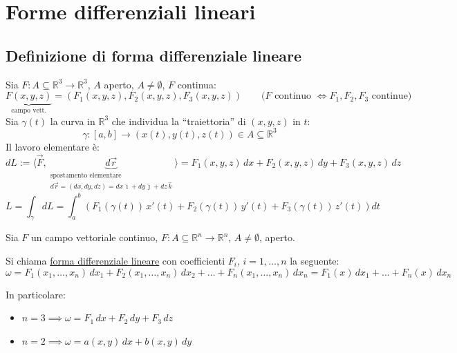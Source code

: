
\section{Forme differenziali lineari}

\subsection{Definizione di forma differenziale lineare}

Sia $F : A \subseteq \mathbb{R}^3 \to \mathbb{R}^3$, $A$ aperto, $A \neq \emptyset$, $F$ continua:
\[
\underbrace{F(x, y, z)}_{\text{campo vett.}} = (F_1(x, y, z), F_2(x, y, z), F_3(x, y, z)) \qquad \text{($F$ continuo $\iff F_1, F_2, F_3$ continue)}
\]
Sia $\gamma(t)$ la curva in $\mathbb{R}^3$ che individua la ``traiettoria'' di $(x, y, z)$ in $t$:
\[
\gamma : [a, b] \to (x(t), y(t), z(t)) \in A \subseteq \mathbb{R}^3
\]
Il lavoro elementare è:
\[
dL := \langle \vec{F}, \underbrace{d\vec{r}}_{\substack{\text{spostamento elementare} \\ d\vec{r} = (dx, dy, dz) = dx\,\hat{\imath} + dy\,\hat{\jmath} + dz\,\hat{k}}} \rangle = F_1(x, y, z)\, dx + F_2(x, y, z)\, dy + F_3(x, y, z)\, dz
\]
\[
L = \int_\gamma dL = \int_a^b \left( F_1(\gamma(t))\, x'(t) + F_2(\gamma(t))\, y'(t) + F_3(\gamma(t))\, z'(t) \right) dt
\]

\begin{definition}
Sia $F$ un campo vettoriale continuo, $F : A \subseteq \mathbb{R}^n \to \mathbb{R}^n$, $A \neq \emptyset$, aperto.

Si chiama \underline{forma differenziale lineare} con coefficienti $F_i$, $i = 1, \dots, n$ la seguente:
\[
\omega = F_1(x_1, \dots, x_n)\, dx_1 + F_2(x_1, \dots, x_n)\, dx_2 + \dots + F_n(x_1, \dots, x_n)\, dx_n = F_1(x)\, dx_1 + \dots + F_n(x)\, dx_n
\]

In particolare:
\begin{itemize}
    \item $n = 3 \implies \omega = F_1\, dx + F_2\, dy + F_3\, dz$
    \item $n = 2 \implies \omega = a(x, y)\, dx + b(x, y)\, dy$
\end{itemize}
\end{definition}

